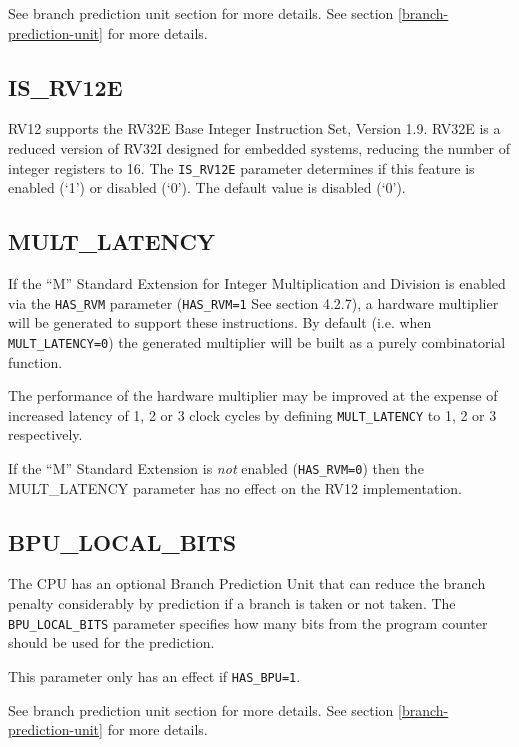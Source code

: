 \ifdefined\MARKDOWN
See branch prediction unit section for more details.
\else
See section \ref{branch-prediction-unit}  for more details.
\fi

\subsection{IS\_RV12E}\label{is_rv12e}

RV12 supports the RV32E Base Integer Instruction Set, Version 1.9. RV32E is a
reduced version of RV32I designed for embedded systems, reducing the number of
integer registers to 16. The \texttt{IS\_RV12E} parameter determines if this
feature is enabled (`1') or disabled (`0'). The default value is disabled (`0').

\subsection{MULT\_LATENCY}\label{mult_latency}

If the ``M'' Standard Extension for Integer Multiplication and Division is
enabled via the \texttt{HAS\_RVM} parameter (\texttt{HAS\_RVM=1} See
section 4.2.7), a hardware multiplier will be generated to support these
instructions. By default (i.e. when \texttt{MULT\_LATENCY=0}) the generated
multiplier will be built as a purely combinatorial function.

The performance of the hardware multiplier may be improved at the expense of
increased latency of 1, 2 or 3 clock cycles by defining \texttt{MULT\_LATENCY}
to 1, 2 or 3 respectively.

If the ``M'' Standard Extension is \emph{not} enabled (\texttt{HAS\_RVM=0})
then the MULT\_LATENCY parameter has no effect on the RV12
implementation.

\subsection{BPU\_LOCAL\_BITS}\label{bpu_local_bits}

The CPU has an optional Branch Prediction Unit that can reduce the branch
penalty considerably by prediction if a branch is taken or not taken. The
\texttt{BPU\_LOCAL\_BITS} parameter specifies how many bits from the program
counter should be used for the prediction.

This parameter only has an effect if \texttt{HAS\_BPU=1}.

\ifdefined\MARKDOWN
See branch prediction unit section for more details.
\else
See section \ref{branch-prediction-unit}  for more details.
\fi

